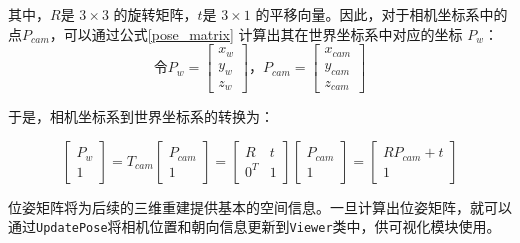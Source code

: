 \par 其中，$R$是 $3 \times 3$ 的旋转矩阵，$t$是 $3 \times 1$ 的平移向量。因此，对于相机坐标系中的点$P_{cam}$，可以通过公式\ref{pose_matrix}
计算出其在世界坐标系中对应的坐标 $P_w$：
\begin{equation*}
	\text{令}P_w =
	\begin{bmatrix}
		x_w \\
		y_w \\
		z_w
	\end{bmatrix}\text{，}
	P_{cam} =
	\begin{bmatrix}
		x_{cam} \\
		y_{cam} \\
		z_{cam}
	\end{bmatrix}
\end{equation*}

\par 于是，相机坐标系到世界坐标系的转换为：

\begin{equation}
	\begin{bmatrix}
		P_w \\
		1
	\end{bmatrix}
	= T_{cam}
	\begin{bmatrix}
		P_{cam} \\
		1
	\end{bmatrix}
	=
	\begin{bmatrix}
		R   & t \\
		0^T & 1
	\end{bmatrix}
	\begin{bmatrix}
		P_{cam} \\
		1
	\end{bmatrix}
	=
	\begin{bmatrix}
		RP_{cam} + t \\
		1
	\end{bmatrix}
	\label{pose_matrix}
\end{equation}

\par 位姿矩阵将为后续的三维重建提供基本的空间信息。一旦计算出位姿矩阵，就可以通过\texttt{UpdatePose}将相机位置和朝向信息更新到\texttt{Viewer}类中，供可视化模块使用。

